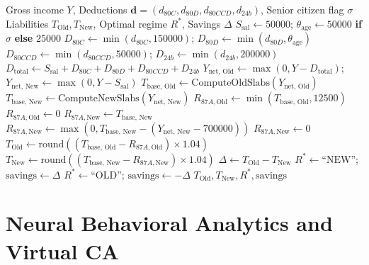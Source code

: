\documentclass[conference]{IEEEtran}
\begin{document}
\begin{algorithm}[t]
\caption{Statutory Dual-Regime Tax Optimization}
\label{alg:tax_engine}
\begin{algorithmic}[1]
\REQUIRE Gross income $Y$, Deductions $\mathbf{d} = (d_{80C}, d_{80D}, d_{80CCD}, d_{24b})$, Senior citizen flag $\sigma$
\ENSURE Liabilities $T_{\text{Old}}, T_{\text{New}}$, Optimal regime $R^*$, Savings $\Delta$
\STATE $S_{\text{sal}} \leftarrow 50000$; $\theta_{\text{age}} \leftarrow 50000$ \textbf{if} $\sigma$ \textbf{else} $25000$
\STATE $D_{80C} \leftarrow \min(d_{80C}, 150000)$; $D_{80D} \leftarrow \min(d_{80D}, \theta_{\text{age}})$
\STATE $D_{80CCD} \leftarrow \min(d_{80CCD}, 50000)$; $D_{24b} \leftarrow \min(d_{24b}, 200000)$
\STATE $D_{\text{total}} \leftarrow S_{\text{sal}} + D_{80C} + D_{80D} + D_{80CCD} + D_{24b}$
\STATE $Y_{\text{net, Old}} \leftarrow \max(0, Y - D_{\text{total}})$; $Y_{\text{net, New}} \leftarrow \max(0, Y - S_{\text{sal}})$
\STATE $T_{\text{base, Old}} \leftarrow \text{ComputeOldSlabs}(Y_{\text{net, Old}})$
\STATE $T_{\text{base, New}} \leftarrow \text{ComputeNewSlabs}(Y_{\text{net, New}})$
    \STATE $R_{87A, \text{Old}} \leftarrow \min(T_{\text{base, Old}}, 12500)$
\ELSE
    \STATE $R_{87A, \text{Old}} \leftarrow 0$
\ENDIF
{}
    \STATE $R_{87A, \text{New}} \leftarrow T_{\text{base, New}}$
    \STATE $R_{87A, \text{New}} \leftarrow \max(0, T_{\text{base, New}} - (Y_{\text{net, New}} - 700000))$
\ELSE
    \STATE $R_{87A, \text{New}} \leftarrow 0$
\ENDIF
\STATE $T_{\text{Old}} \leftarrow \text{round}((T_{\text{base, Old}} - R_{87A, \text{Old}}) \times 1.04)$
\STATE $T_{\text{New}} \leftarrow \text{round}((T_{\text{base, New}} - R_{87A, \text{New}}) \times 1.04)$
\STATE $\Delta \leftarrow T_{\text{Old}} - T_{\text{New}}$
    \STATE $R^* \leftarrow \text{``NEW''}$; $\text{savings} \leftarrow \Delta$
\ELSE
    \STATE $R^* \leftarrow \text{``OLD''}$; $\text{savings} \leftarrow -\Delta$
\ENDIF
\RETURN $T_{\text{Old}}, T_{\text{New}}, R^*, \text{savings}$
\end{algorithmic}
\end{algorithm}

\section{Neural Behavioral Analytics and Virtual CA}
\end{document}
